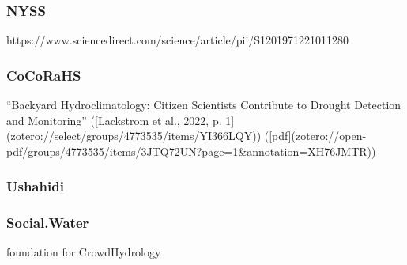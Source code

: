 {\subsubsection{NYSS}
https://www.sciencedirect.com/science/article/pii/S1201971221011280

\subsubsection{CoCoRaHS}
“Backyard Hydroclimatology: Citizen Scientists Contribute to Drought Detection and Monitoring” ([Lackstrom et al., 2022, p. 1](zotero://select/groups/4773535/items/YI366LQY)) ([pdf](zotero://open-pdf/groups/4773535/items/3JTQ72UN?page=1&annotation=XH76JMTR))

\subsubsection{Ushahidi} %

\subsubsection{Social.Water}
foundation for CrowdHydrology
}
